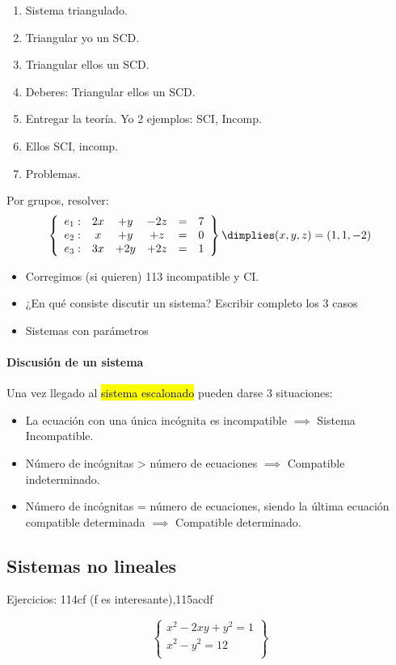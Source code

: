 \begin{enumerate}
	\item Sistema triangulado.
	\item Triangular yo un SCD.
	\item Triangular ellos un SCD.
	\item Deberes: Triangular ellos un SCD.
	\item Entregar la teoría. Yo 2 ejemplos: SCI, Incomp.
	\item Ellos SCI, incomp.
	\item Problemas.
\end{enumerate}

Por grupos, resolver:
\[
\left\{\begin{array}{lccccc}
e_1: &2x&+y&-2z&=&7\\
e_2: &x&+y&+z&=&0\\
e_3: &3x&+2y&+2z&=&1
\end{array}\right\} \dimplies (x,y,z) = (1,1,-2)
\]



\begin{itemize}
	\item Corregimos (si quieren) 113 incompatible y CI.
	\item ¿En qué consiste discutir un sistema? Escribir completo los 3 casos
	\item Sistemas con parámetros
\end{itemize}

\paragraph{Discusión de un sistema}

Una vez llegado al \hl{sistema escalonado} pueden darse 3 situaciones:

\begin{itemize}
	\item La ecuación con una única incógnita es incompatible $\implies$ Sistema Incompatible.
	\item Número de incógnitas > número de ecuaciones $\implies$ Compatible indeterminado.
	\item Número de incógnitas = número de ecuaciones, siendo la última ecuación compatible determinada $\implies$ Compatible determinado.
\end{itemize}


\subsection{Sistemas no lineales}

Ejercicios: 114cf (f es interesante),115acdf

\[
\left\{
	\begin{array}{c}
		x^2-2xy+y^2 = 1\\
		x^2-y^2 = 12\\
	\end{array}
\right\}
\]